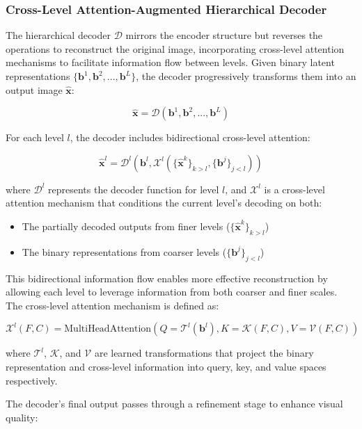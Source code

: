\documentclass[10pt,twocolumn,letterpaper]{article}
\newcommand{\bm}[1]{\boldsymbol{#1}}
\newcommand{\binary}{\bm{b}}
\newcommand{\decoder}{\mathcal{D}}
\newcommand{\img}{\bm{x}}
\newcommand{\recon}{\hat{\bm{x}}}
\begin{document}
\subsubsection{Cross-Level Attention-Augmented Hierarchical Decoder}
The hierarchical decoder $\decoder$ mirrors the encoder structure but reverses the operations to reconstruct the original image, incorporating cross-level attention mechanisms to facilitate information flow between levels. Given binary latent representations $\{\binary^1, \binary^2, ..., \binary^L\}$, the decoder progressively transforms them into an output image $\recon$:

\begin{equation}
\recon = \decoder(\binary^1, \binary^2, ..., \binary^L)
\end{equation}

For each level $l$, the decoder includes bidirectional cross-level attention:

\begin{equation}
\hat{\img}^l = \mathcal{D}^l(\binary^l, \mathcal{X}^l(\{\hat{\img}^{k}\}_{k>l}, \{\binary^{j}\}_{j<l}))
\end{equation}

where $\mathcal{D}^l$ represents the decoder function for level $l$, and $\mathcal{X}^l$ is a cross-level attention mechanism that conditions the current level's decoding on both:
\begin{itemize}
    \item The partially decoded outputs from finer levels ($\{\hat{\img}^{k}\}_{k>l}$)
    \item The binary representations from coarser levels ($\{\binary^{j}\}_{j<l}$)
\end{itemize}

This bidirectional information flow enables more effective reconstruction by allowing each level to leverage information from both coarser and finer scales. The cross-level attention mechanism is defined as:

\begin{equation}
\mathcal{X}^l(F, C) = \text{MultiHeadAttention}(Q=\mathcal{T}^l(\binary^l), K=\mathcal{K}(F, C), V=\mathcal{V}(F, C))
\end{equation}

where $\mathcal{T}^l$, $\mathcal{K}$, and $\mathcal{V}$ are learned transformations that project the binary representation and cross-level information into query, key, and value spaces respectively.

The decoder's final output passes through a refinement stage to enhance visual quality:
\end{document}
